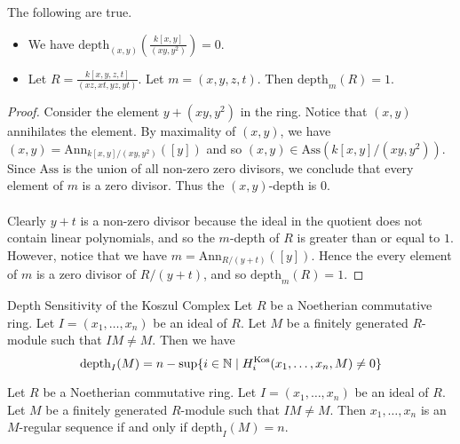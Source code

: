 \documentclass[a4paper]{article}
\begin{document}
\begin{eg}{} The following are true. 
\begin{itemize}
\item We have $\text{depth}_{(x,y)}\left(\frac{k[x,y]}{(xy,y^2)}\right)=0$. 
\item Let $R=\frac{k[x,y,z,t]}{(xz,xt,yz,yt)}$. Let $m=(x,y,z,t)$. Then $\text{depth}_m(R)=1$. 
\end{itemize} 
\begin{proof}
Consider the element $y+(xy,y^2)$ in the ring. Notice that $(x,y)$ annihilates the element. By maximality of $(x,y)$, we have $(x,y)=\text{Ann}_{k[x,y]/(xy,y^2)}([y])$ and so $(x,y)\in\text{Ass}(k[x,y]/(xy,y^2))$. Since $\text{Ass}$ is the union of all non-zero zero divisors, we conclude that every element of $m$ is a zero divisor. Thus the $(x,y)$-depth is $0$. \\~\\

Clearly $y+t$ is a non-zero divisor because the ideal in the quotient does not contain linear polynomials, and so the $m$-depth of $R$ is greater than or equal to $1$. However, notice that we have $m=\text{Ann}_{R/(y+t)}([y])$. Hence the every element of $m$ is a zero divisor of $R/(y+t)$, and so $\text{depth}_m(R)=1$. 
\end{proof}
\end{eg}

\begin{prp}{Depth Sensitivity of the Koszul Complex}{} Let $R$ be a Noetherian commutative ring. Let $I=(x_1,\dots,x_n)$ be an ideal of $R$. Let $M$ be a finitely generated $R$-module such that $IM\neq M$. Then we have $$\text{depth}_I(M)=n-\sup\{i\in\mathbb{N}\;|\;H_i^\text{Kos}(x_1,\dots,x_n,M)\neq 0\}$$
\end{prp}

\begin{crl}{}{} Let $R$ be a Noetherian commutative ring. Let $I=(x_1,\dots,x_n)$ be an ideal of $R$. Let $M$ be a finitely generated $R$-module such that $IM\neq M$. Then $x_1,\dots,x_n$ is an $M$-regular sequence if and only if $\text{depth}_I(M)=n$. 
\end{crl}
\end{document}
